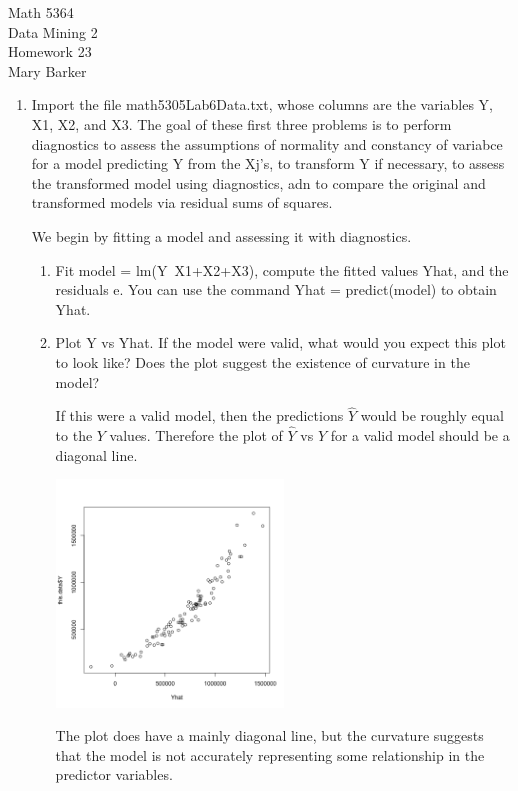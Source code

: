 \documentclass[11pt]{article}
\begin{document}
\noindent\large{Math 5364}\\
\large{Data Mining 2}\\
\large{Homework 23}\\
\large{Mary Barker}
\doublespace

\begin{enumerate}
\item 
Import the file math5305Lab6Data.txt, whose columns are the variables 
Y, X1, X2, and X3. The goal of these first three problems is to 
perform diagnostics to assess the assumptions of normality and constancy 
of variabce for a model predicting Y from the Xj's, to transform Y if 
necessary, to assess the transformed model using diagnostics, adn to 
compare the original and transformed models via residual sums of squares. 

We begin by fitting a model and assessing it with diagnostics. 

\begin{enumerate}
\item 
Fit model = lm(Y~X1+X2+X3), compute the fitted values Yhat, and the 
residuals e. You can use the command Yhat = predict(model) to obtain 
Yhat. 

\item 
Plot Y vs Yhat. If the model were valid, what would you expect this 
plot to look like? Does the plot suggest the existence of curvature 
in the model? 

If this were a valid model, then the predictions $\hat{Y}$ would be 
roughly equal to the $Y$ values. Therefore the plot of $\hat{Y}$ vs 
$Y$ for a valid model should be a diagonal line. 

\begin{center}
\includegraphics[width=0.5\textwidth]{Yhat_vs_Y}
\end{center}

The plot does have a mainly diagonal line, but the curvature suggests 
that the model is not accurately representing some relationship in the 
predictor variables. 


\end{enumerate}
\end{enumerate}
\end{document}
